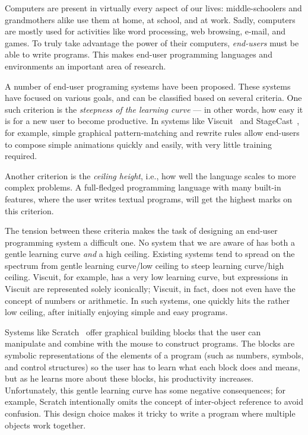 
Computers are present in virtually every aspect of our lives:
middle-schoolers and grandmothers alike use them at home, at school,
and at work. Sadly, computers are mostly used for activities like word
processing, web browsing, e-mail, and games. To truly take advantage
the power of their computers, {\em end-users} must be able to write
programs. This makes end-user programming languages and environments
an important area of research.

A number of end-user programing systems have been proposed.
These systems have focused on various goals, and can be
classified based on several criteria.  One such criterion is the {\em
steepness of the learning curve} --- in other words, how easy it is for
a new user to become productive.  In systems like
Viscuit~\cite{yh03viscuit} and StageCast~\cite{dcs00stagecast}, for
example, simple graphical pattern-matching and rewrite rules allow
end-users to compose simple animations quickly and easily, with very
little training required.

Another criterion is the {\em ceiling height}, i.e., how well the language scales to more complex
problems. A full-fledged programming language with many built-in
features, where the user writes textual programs, will get the highest
marks on this criterion.

  The tension between these criteria makes the task of designing an end-user
programming system a difficult one.
No system that we are aware of has both a gentle
learning curve {\em and} a high ceiling.  Existing systems tend to
spread on the spectrum from gentle learning curve/low ceiling to
steep learning curve/high ceiling.  Viscuit, for example, has a
very low learning curve, but expressions in Viscuit are represented
solely iconically; Viscuit, in fact, does not even have the concept of
numbers or arithmetic.  In such systems, one quickly hits the rather
low ceiling, after initially enjoying simple and easy programs.

  Systems like Scratch~\cite{mbkrsr04@scratch} offer graphical building blocks
that the user can manipulate and combine
with the mouse to construct programs.  The blocks are symbolic
representations of the elements of a program (such as numbers, symbols, and control structures) so the user
has to learn what each block does and means, but as he learns more
about these blocks, his productivity increases.
Unfortunately, this gentle learning curve has some negative
consequences; for example, Scratch intentionally omits the concept of inter-object
reference to avoid confusion.  This design choice makes it
tricky to write a program where multiple objects work together.

